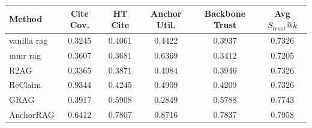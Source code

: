 \begin{tabular}{lccccc}
\toprule
Method & Cite Cov. & HT Cite & Anchor Util. & Backbone Trust & Avg $S_{trust}@k$ \\
\midrule
vanilla rag & 0.3245 & 0.4061 & 0.4422 & 0.3937 & 0.7326 \\
mmr rag & 0.3607 & 0.3681 & 0.6369 & 0.3412 & 0.7205 \\
R2AG & 0.3365 & 0.3871 & 0.4984 & 0.3946 & 0.7326 \\
ReClaim & 0.9344 & 0.4245 & 0.4909 & 0.4209 & 0.7326 \\
GRAG & 0.3917 & 0.5908 & 0.2849 & 0.5788 & 0.7743 \\
AnchorRAG & 0.6412 & 0.7807 & 0.8716 & 0.7837 & 0.7958 \\
\bottomrule
\end{tabular}
